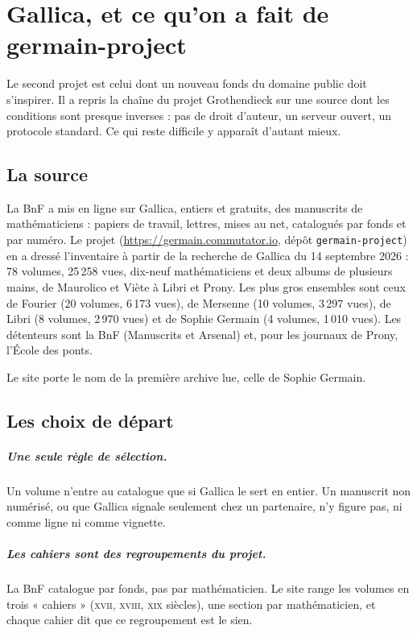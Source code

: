\chapter{Gallica, et ce qu'on a fait de germain-project}\label{ch:gallica}

Le second projet est celui dont un nouveau fonds du domaine public doit s'inspirer. Il a
repris la chaîne du projet Grothendieck sur une source dont les conditions sont presque
inverses : pas de droit d'auteur, un serveur ouvert, un protocole standard. Ce qui reste
difficile y apparaît d'autant mieux.

\section{La source}

La BnF a mis en ligne sur Gallica, entiers et gratuits, des manuscrits de mathématiciens :
papiers de travail, lettres, mises au net, catalogués par fonds et par numéro. Le projet
(\url{https://germain.commutator.io}, dépôt \texttt{germain-project}) en a dressé
l'inventaire à partir de la recherche de Gallica du 14 septembre 2026 : 78 volumes, 25\,258
vues, dix-neuf mathématiciens et deux albums de plusieurs mains, de Maurolico et Viète à
Libri et Prony. Les plus gros ensembles sont ceux de Fourier (20 volumes, 6\,173 vues), de
Mersenne (10 volumes, 3\,297 vues), de Libri (8 volumes, 2\,970 vues) et de Sophie Germain
(4 volumes, 1\,010 vues). Les détenteurs sont la BnF (Manuscrits et Arsenal) et, pour les
journaux de Prony, l'École des ponts.

Le site porte le nom de la première archive lue, celle de Sophie Germain.

\section{Les choix de départ}

\paragraph{Une seule règle de sélection.} Un volume n'entre au catalogue que si Gallica le
sert en entier. Un manuscrit non numérisé, ou que Gallica signale seulement chez un
partenaire, n'y figure pas, ni comme ligne ni comme vignette.

\paragraph{Les cahiers sont des regroupements du projet.} La BnF catalogue par fonds, pas
par mathématicien. Le site range les volumes en trois « cahiers » (\textsc{xvii}\ieme,
\textsc{xviii}\ieme, \textsc{xix}\ieme{} siècles), une section par mathématicien, et chaque
cahier dit que ce regroupement est le sien.


